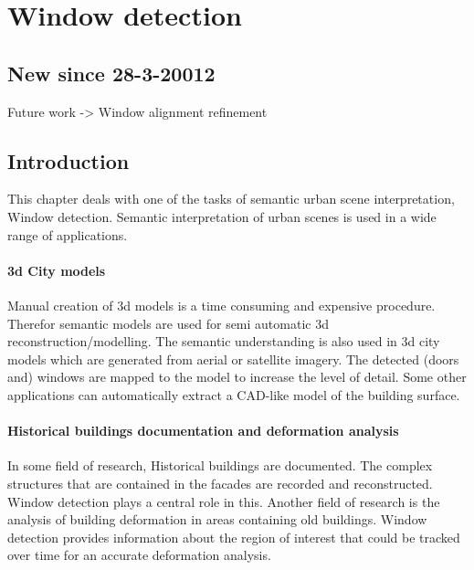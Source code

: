 





%
%




\section{Window detection}
\subsection{New since 28-3-20012}
Future work -> Window alignment refinement


\label{chap:windowDetection}
\subsection{Introduction}
This chapter deals with one of the tasks of semantic urban scene interpretation, Window detection. 
Semantic interpretation of urban scenes is used in a wide range of applications.

\paragraph{3d City models} 
	Manual creation of 3d models is a time consuming and expensive procedure.
	Therefor semantic models are used for semi automatic 3d
	reconstruction/modelling.
	The semantic understanding is also used in 3d city models which are
	generated from aerial or satellite imagery.  The detected (doors and)
	windows are mapped to the model to increase the level of detail. 
	Some other applications can automatically extract a CAD-like model of
	the building surface.

\paragraph{Historical buildings documentation and deformation analysis}
	In some field of research, Historical buildings are documented. The complex
	structures that are contained in the facades are recorded and reconstructed.
	Window detection plays a central role in this. 
	Another field of research is the analysis of building deformation in areas
	containing old buildings.  Window detection provides information about the
	region of interest that could be tracked over time for an accurate
	deformation analysis.


